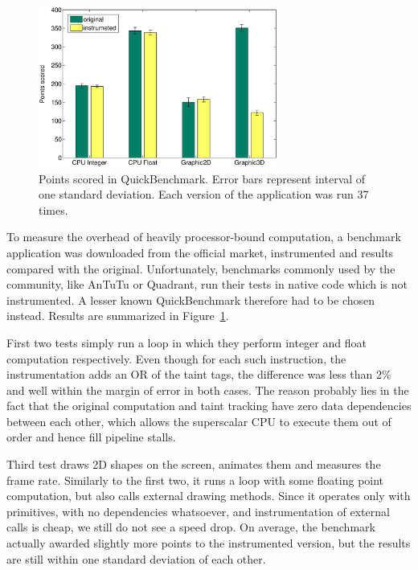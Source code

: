 \documentclass[12pt,twoside,notitlepage]{report}
\begin{document}
\begin{figure}
	\centerline{
		\includegraphics[width=0.7\textwidth]{figs/fig_eval_quickbench.eps}
	}
	\caption{Points scored in QuickBenchmark. Error bars represent interval of one standard deviation. Each version of the application was run 37 times.}
	\label{figure:Evalutaion_QuickBench}
\end{figure}

To measure the overhead of heavily processor-bound computation, a benchmark application was downloaded from the official market, instrumented and results compared with the original. Unfortunately, benchmarks commonly used by the community, like AnTuTu or Quadrant, run their tests in native code which is not instrumented. A lesser known QuickBenchmark therefore had to be chosen instead. Results are summarized in Figure~\ref{figure:Evalutaion_QuickBench}. 

First two tests simply run a loop in which they perform integer and float computation respectively. Even though for each such instruction, the instrumentation adds an OR of the taint tags, the difference was less than 2\% and well within the margin of error in both cases. The reason probably lies in the fact that the original computation and taint tracking have zero data dependencies between each other, which allows the superscalar CPU to execute them out of order and hence fill pipeline stalls.

Third test draws 2D shapes on the screen, animates them and measures the frame rate. Similarly to the first two, it runs a loop with some floating point computation, but also calls external drawing methods. Since it operates only with primitives, with no dependencies whatsoever, and instrumentation of external calls is cheap, we still do not see a speed drop. On average, the benchmark actually awarded slightly more points to the instrumented version, but the results are still within one standard deviation of each other. 
\end{document}
